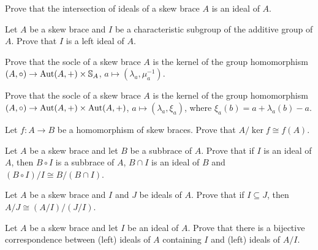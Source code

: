 \begin{prob}
\label{prob:sum_ideals}
Prove that the intersection of ideals of a skew brace $A$ is an ideal of $A$. 
\end{prob}

\begin{prob}
Let $A$ be a skew brace and $I$ be a characteristic subgroup of the additive group of $A$. Prove that
$I$ is a left ideal of $A$. 
\end{prob}


\begin{prob}
\label{prob:Bachiller1}
Prove that the socle of a skew brace $A$ is the kernel of the 
group homomorphism $(A,\circ)\to\operatorname{Aut}(A,+)\times\mathbb{S}_A$, $a\mapsto (\lambda_a,\mu_a^{-1})$. 
\end{prob}

\begin{prob}
\label{prob:Bachiller2}
Prove that the socle of a skew brace $A$ is the kernel of the 
group homomorphism $(A,\circ)\to\operatorname{Aut}(A,+)\times\operatorname{Aut}(A,+)$, $a\mapsto (\lambda_a,\xi_a)$, where
$\xi_a(b)=a+\lambda_a(b)-a$. 
\end{prob}

\begin{prob}
\label{prob:iso1}
    Let $f\colon A\to B$ be a homomorphism of skew braces. Prove that $A/\ker f\cong f(A)$. 
\end{prob}

\begin{prob}
\label{prob:iso2}
    Let $A$ be a skew brace and let $B$ be a subbrace of $A$. Prove that if $I$ is an ideal of $A$, 
    then $B\circ I$ is a subbrace of $A$, 
    $B\cap I$ is an ideal of $B$ and $(B\circ I)/I\cong B/(B\cap I)$. 
\end{prob}

\begin{prob}
\label{prob:iso3}
Let $A$ be a skew brace and $I$ and $J$ be ideals of $A$. Prove that if $I\subseteq J$, then
$A/J\cong (A/I)/(J/I)$. 
\end{prob}

\begin{prob}
\label{prob:correspondence}
Let $A$ be a skew brace and let $I$ be an ideal of $A$. Prove that there is a bijective correspondence between (left) ideals 
of $A$ containing $I$ and (left) ideals of $A/I$. 
\end{prob}

